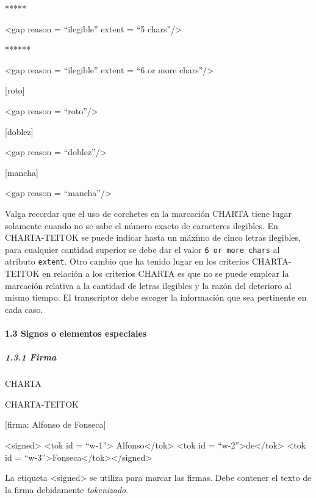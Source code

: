 \documentclass[
]{book}
\begin{document}
*****

{\textless gap} {reason} {=} {``ilegible''} {extent} {=} {``5 chars''}{/\textgreater{}}

******

{\textless gap} {reason} {=} {``ilegible''} {extent} {=} {``6 or more chars''}{/\textgreater{}}

{[}roto{]}

{\textless gap} {reason} {=} {``roto''}{/\textgreater{}}

{[}doblez{]}

{\textless gap} {reason} {=} {``doblez''}{/\textgreater{}}

{[}mancha{]}

{\textless gap} {reason} {=} {``mancha''}{/\textgreater{}}

Valga recordar que el uso de corchetes en la marcación CHARTA tiene lugar solamente cuando no se sabe el número exacto de caracteres ilegibles. En CHARTA-TEITOK se puede indicar hasta un máximo de cinco letras ilegibles, para cualquier cantidad superior se debe dar el valor \texttt{6\ or\ more\ chars} al atributo \texttt{extent}.
Otro cambio que ha tenido lugar en los criterios CHARTA-TEITOK en relación a los criterios CHARTA es que no se puede emplear la marcación relativa a la cantidad de letras ilegibles y la razón del deterioro al mismo tiempo. El transcriptor debe escoger la información que sea pertinente en cada caso.

\hypertarget{signos-o-elementos-especiales}{%
\paragraph*{1.3 Signos o elementos especiales}\label{signos-o-elementos-especiales}}

\hypertarget{firma}{%
\subparagraph*{1.3.1 Firma}\label{firma}}

CHARTA

CHARTA-TEITOK

{[}firma: Alfonso de Fonseca{]}

{\textless signed\textgreater{}} {\textless tok} {id} {=} {``w-1''}{\textgreater{}} Alfonso{\textless/tok\textgreater{}} {\textless tok} {id} {=} {``w-2''}{\textgreater{}}de{\textless/tok\textgreater{}}
{\textless tok} {id} {=} {``w-3''}{\textgreater{}}Fonseca{\textless/tok\textgreater{}}{\textless/signed\textgreater{}}

La etiqueta { \textless signed\textgreater{}} se utiliza para marcar las firmas. Debe contener el texto de la firma debidamente \emph{tokenizado}.
\end{document}
